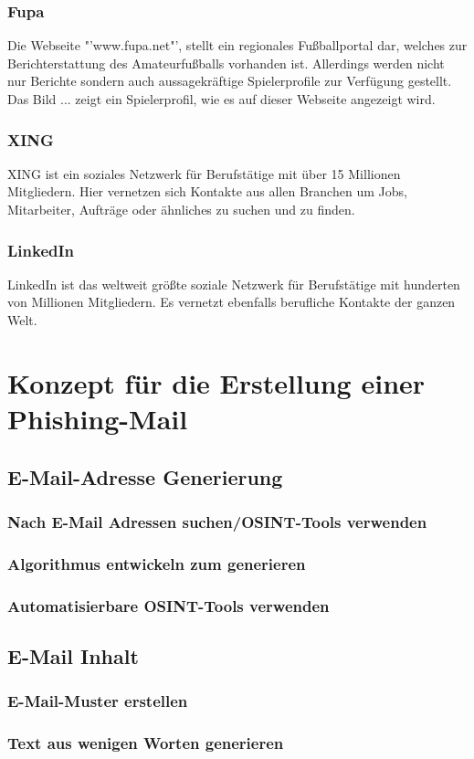 		\subsubsection{Fupa}
		Die Webseite "'www.fupa.net"', stellt ein regionales Fußballportal dar, welches zur Berichterstattung des Amateurfußballs vorhanden ist. Allerdings werden nicht nur Berichte sondern auch aussagekräftige Spielerprofile zur Verfügung gestellt.\cite{WasIstFUPA}
		Das Bild ... zeigt ein Spielerprofil, wie es auf dieser Webseite angezeigt wird.
		\subsubsection{XING}
		XING ist ein soziales Netzwerk für Berufstätige mit über 15 Millionen Mitgliedern. Hier vernetzen sich Kontakte aus allen Branchen um Jobs, Mitarbeiter, Aufträge oder ähnliches zu suchen und zu finden.\cite{WasIstXING}
		\subsubsection{LinkedIn}
		LinkedIn ist das weltweit größte soziale Netzwerk für Berufstätige mit hunderten von Millionen Mitgliedern. Es vernetzt ebenfalls berufliche Kontakte der ganzen Welt. \cite{WasIstLinkedIn}
		
\section{Konzept für die Erstellung einer Phishing-Mail}
	\subsection{E-Mail-Adresse Generierung}
		\subsubsection{Nach E-Mail Adressen suchen/OSINT-Tools verwenden}
		\subsubsection{Algorithmus entwickeln zum generieren}
		\subsubsection{Automatisierbare OSINT-Tools verwenden}
	\subsection{E-Mail Inhalt}
		\subsubsection{E-Mail-Muster erstellen}
		\subsubsection{Text aus wenigen Worten generieren}
		
